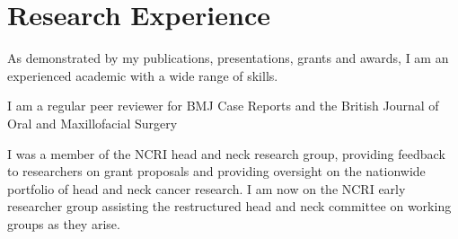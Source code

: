 \section*{Research Experience}

As demonstrated by my publications, presentations, grants and awards, I am an experienced academic with a wide range of skills.

I am a regular peer reviewer for BMJ Case Reports and the British Journal of Oral and Maxillofacial Surgery

I was a member of the NCRI head and neck research group, providing feedback to researchers on grant proposals and providing oversight on the nationwide portfolio of head and neck cancer research. I am now on the NCRI early researcher group assisting the restructured head and neck committee on working groups as they arise.




